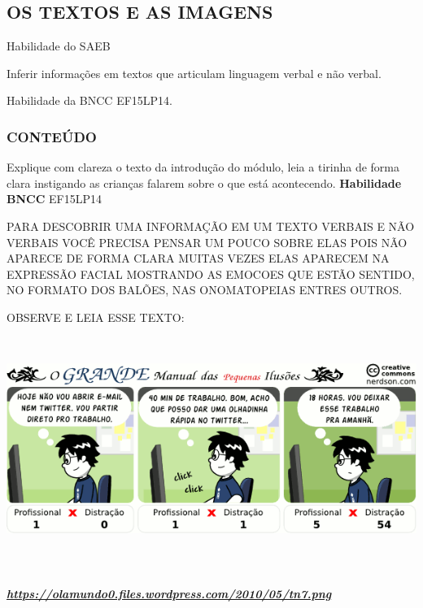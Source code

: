 \begin{escola}
\chapter{OS TEXTOS E AS IMAGENS}

\protect\hypertarget{_heading=h.3c1jaqhv8nr}{}{}

\protect\hypertarget{_heading=h.kyrxefm3laa1}{}{}Habilidade do SAEB

\protect\hypertarget{_heading=h.er3p7jk5yewm}{}{}Inferir informações em textos que articulam linguagem verbal e não verbal.

\protect\hypertarget{_heading=h.69rmtrb8c7jb}{}{}

\protect\hypertarget{_heading=h.23ckvvd}{}{}Habilidade da BNCC
EF15LP14.

\subsection{CONTEÚDO}\label{conteuxfado-6}

Explique com clareza o texto da introdução do módulo, leia a tirinha de
forma clara instigando as crianças falarem sobre o que está acontecendo.
\textbf{Habilidade BNCC} EF15LP14

PARA DESCOBRIR UMA INFORMAÇÃO EM UM TEXTO VERBAIS E NÃO VERBAIS VOCÊ
PRECISA PENSAR UM POUCO SOBRE ELAS POIS NÃO APARECE DE FORMA CLARA
MUITAS VEZES ELAS APARECEM NA EXPRESSÃO FACIAL MOSTRANDO AS EMOCOES QUE
ESTÃO SENTIDO, NO FORMATO DOS BALÕES, NAS ONOMATOPEIAS ENTRES OUTROS.

OBSERVE E LEIA ESSE TEXTO:
\includegraphics[width=6.51667in,height=3.14097in]{media/image170.png}

\href{https://olamundo0.files.wordpress.com/2010/05/tn7.png}{\textbf{\emph{https://olamundo0.files.wordpress.com/2010/05/tn7.png}}}


\end{escola}
